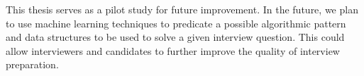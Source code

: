 \documentclass[conference]{IEEEtran}
\begin{document}
This thesis serves as a pilot study for future improvement. In the future, we plan to use machine learning techniques to predicate a possible algorithmic pattern and data structures to be used to solve a given interview question. This could allow interviewers and candidates to further improve the quality of interview preparation.


\nocite{goodrich2014data,carrano2003data,MossBowyer,VKuncak,Karp:1987,Ragkhitwetsagul2017,Chilowicz,gitHUb}



\end{document}
